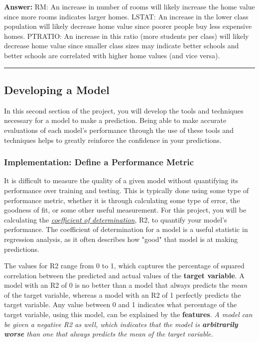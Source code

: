 \documentclass[11pt]{article}
\begin{document}
    \textbf{Answer: } RM: An increase in number of rooms will likely
increase the home value since more rooms indicates larger homes. LSTAT:
An increase in the lower class population will likely decrease home
value since poorer people buy less expensive homes. PTRATIO: An increase
in this ratio (more students per class) will likely decrease home value
since smaller class sizes may indicate better schools and better schools
are correlated with higher home values (and vice versa).

    \begin{center}\rule{0.5\linewidth}{\linethickness}\end{center}

\subsection{Developing a Model}\label{developing-a-model}

In this second section of the project, you will develop the tools and
techniques necessary for a model to make a prediction. Being able to
make accurate evaluations of each model's performance through the use of
these tools and techniques helps to greatly reinforce the confidence in
your predictions.

    \subsubsection{Implementation: Define a Performance
Metric}\label{implementation-define-a-performance-metric}

It is difficult to measure the quality of a given model without
quantifying its performance over training and testing. This is typically
done using some type of performance metric, whether it is through
calculating some type of error, the goodness of fit, or some other
useful measurement. For this project, you will be calculating the
\href{http://stattrek.com/statistics/dictionary.aspx?definition=coefficient_of_determination}{\emph{coefficient
of determination}}, R2, to quantify your model's performance. The
coefficient of determination for a model is a useful statistic in
regression analysis, as it often describes how "good" that model is at
making predictions.

The values for R2 range from 0 to 1, which captures the percentage of
squared correlation between the predicted and actual values of the
\textbf{target variable}. A model with an R2 of 0 is no better than a
model that always predicts the \emph{mean} of the target variable,
whereas a model with an R2 of 1 perfectly predicts the target variable.
Any value between 0 and 1 indicates what percentage of the target
variable, using this model, can be explained by the \textbf{features}.
\emph{A model can be given a negative R2 as well, which indicates that
the model is \textbf{arbitrarily worse} than one that always predicts
the mean of the target variable.}
\end{document}
